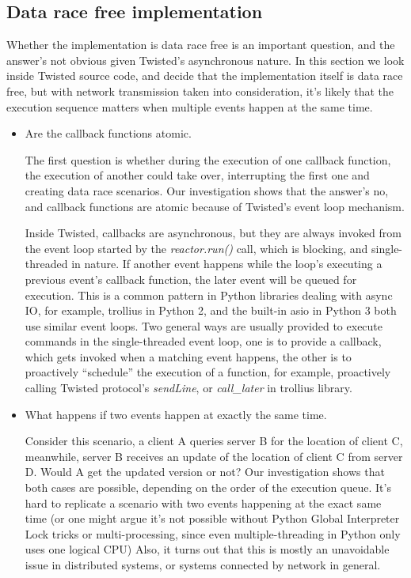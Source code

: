 \documentclass[letterpaper,twocolumn,10pt]{article}
\begin{document}
\subsection{Data race free implementation}

Whether the implementation is data race free is an important question, and the answer's not obvious given Twisted's asynchronous nature. In this section we look inside Twisted source code, and decide that the implementation itself is data race free, but with network transmission taken into consideration, it's likely that the execution sequence matters when multiple events happen at the same time.

\begin{itemize}
\item {Are the callback functions atomic.} 

The first question is whether during the execution of one callback function, the execution of another could take over, interrupting the first one and creating data race scenarios. Our investigation shows that the answer's no, and callback functions are atomic because of Twisted's event loop mechanism. 

Inside Twisted, callbacks are asynchronous, but they are always invoked from the event loop started by the \textit{reactor.run()} call, which is blocking, and single-threaded in nature\cite{TwistedThreads}. If another event happens while the loop's executing a previous event's callback function, the later event will be queued for execution. This is a common pattern in Python libraries dealing with async IO, for example, trollius in Python 2, and the built-in asio in Python 3 both use similar event loops. Two general ways are usually provided to execute commands in the single-threaded event loop, one is to provide a callback, which gets invoked when a matching event happens, the other is to proactively ``schedule'' the execution of a function, for example, proactively calling Twisted protocol's \textit{sendLine}, or \textit{call\_later} in trollius library.

\item {What happens if two events happen at exactly the same time.}

Consider this scenario, a client A queries server B for the location of client C, meanwhile, server B receives an update of the location of client C from server D. Would A get the updated version or not? Our investigation shows that both cases are possible, depending on the order of the execution queue. It's hard to replicate a scenario with two events happening at the exact same time (or one might argue it's not possible without Python Global Interpreter Lock tricks or multi-processing, since even multiple-threading in Python only uses one logical CPU) \cite{PythonGIL}
Also, it turns out that this is mostly an unavoidable issue in distributed systems, or systems connected by network in general.
\end{itemize}
\end{document}
